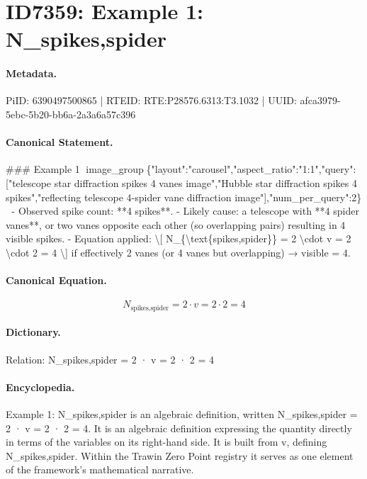 \section*{ID7359: Example 1: N\_spikes,spider}
\paragraph{Metadata.}
PiID: 6390497500865 | RTEID: RTE:P28576.6313:T3.1032 | UUID: afca3979-5ebc-5b20-bb6a-2a3a6a57c396

\paragraph{Canonical Statement.}
\#\#\# Example 1 image\_group\{"layout":"carousel","aspect\_ratio":"1:1","query":["telescope star diffraction spikes 4 vanes image","Hubble star diffraction spikes 4 spikes","reflecting telescope 4-spider vane diffraction image"],"num\_per\_query":2\} - Observed spike count: **4 spikes**. - Likely cause: a telescope with **4 spider vanes**, or two vanes opposite each other (so overlapping pairs) resulting in 4 visible spikes. - Equation applied: \textbackslash{}[ N\_\{\textbackslash{}text\{spikes,spider\}\} = 2 \textbackslash{}cdot v = 2 \textbackslash{}cdot 2 = 4 \textbackslash{}] if effectively 2 vanes (or 4 vanes but overlapping) → visible = 4.

\paragraph{Canonical Equation.}
\[
N_{\text{spikes,spider}} = 2 \cdot v = 2 \cdot 2 = 4
\]

\paragraph{Dictionary.}
Relation: N\_spikes,spider = 2 · v = 2 · 2 = 4

\paragraph{Encyclopedia.}
Example 1: N\_spikes,spider is an algebraic definition, written N\_spikes,spider = 2 · v = 2 · 2 = 4. It is an algebraic definition expressing the quantity directly in terms of the variables on its right-hand side. It is built from v, defining N\_spikes,spider. Within the Trawin Zero Point registry it serves as one element of the framework's mathematical narrative.
